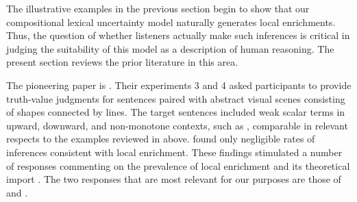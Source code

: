 \documentclass[leqno,12pt]{article}
\begin{document}
The illustrative examples in the previous section begin to show that
our compositional lexical uncertainty model naturally generates local
enrichments. Thus, the question of whether listeners actually make
such inferences is critical in judging the suitability of this model
as a description of human reasoning.  The present section reviews the
prior literature in this area.

The pioneering paper is \citealt{Geurts:Pouscoulous:2009}. Their
experiments 3 and 4 asked participants to provide truth-value
judgments for sentences paired with abstract visual scenes consisting
of shapes connected by lines. The target sentences included weak
scalar terms in upward, downward, and non-monotone contexts, such as
, comparable in relevant respects to the examples reviewed
in  above.
\citeauthor{Geurts:Pouscoulous:2009} found only negligible rates of
inferences consistent with local enrichment. These findings stimulated
a number of responses commenting on the prevalence of local enrichment
and its theoretical import \citep{Ippolito:2010,Sauerland:2010}. The
two responses that are most relevant for our purposes are those of
\citet{Clifton:Dube:2010} and \citet{Chemla:Spector:2011}.
\end{document}
